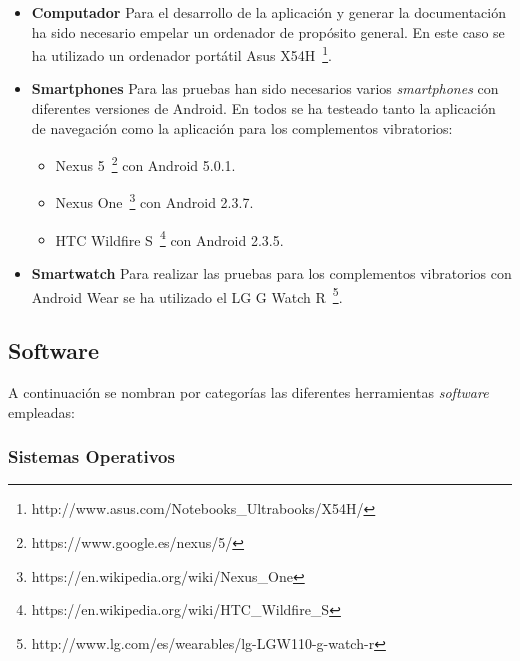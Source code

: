 \begin{itemize}
  \item \textbf{Computador} Para el desarrollo de la aplicación y generar la documentación ha sido
    necesario empelar un ordenador de propósito general. En este caso se ha utilizado un ordenador
    portátil Asus X54H~\footnote{http://www.asus.com/Notebooks\_Ultrabooks/X54H/}.

  \item \textbf{Smartphones} Para las pruebas han sido necesarios varios \emph{smartphones} con
    diferentes versiones de Android. En todos se ha testeado tanto la aplicación de navegación como
    la aplicación para los complementos vibratorios:
    \begin{itemize}
      \item Nexus 5~\footnote{https://www.google.es/nexus/5/} con Android 5.0.1.
      \item Nexus One~\footnote{https://en.wikipedia.org/wiki/Nexus\_One} con Android 2.3.7.
      \item HTC Wildfire S~\footnote{https://en.wikipedia.org/wiki/HTC\_Wildfire\_S} con Android
        2.3.5.
    \end{itemize}

  \item \textbf{Smartwatch} Para realizar las pruebas para los complementos vibratorios con Android
    Wear se ha utilizado el LG G Watch
    R~\footnote{http://www.lg.com/es/wearables/lg-LGW110-g-watch-r}.

\end{itemize}

\subsection{Software}
\label{sec:herramientasSoftware}

A continuación se nombran por categorías las diferentes herramientas \emph{software} empleadas:

\subsubsection{Sistemas Operativos}

